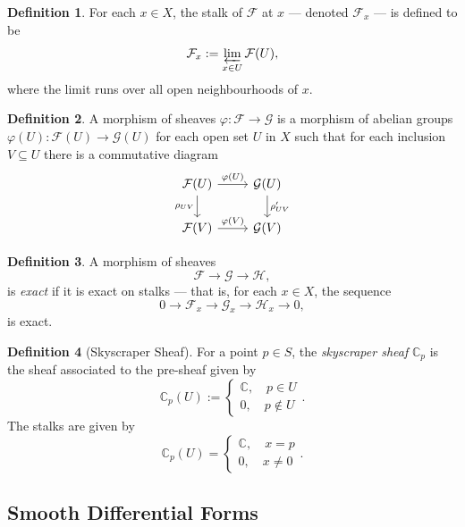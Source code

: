 \documentclass[a4paper]{report}
\theoremstyle{definition}
\newtheorem{definition}{Definition}
\theoremstyle{remark}
\theoremstyle{proposition}
\theoremstyle{conjecture}
\theoremstyle{lemma}
\theoremstyle{corollary}
\theoremstyle{exercise}
\theoremstyle{example}
\newcommand{\C}{\mathbb{C}}
\newcommand{\mcal}{\mathcal}
\begin{document}
\begin{definition}
    For each $x\in X$, the stalk of $\mcal{F}$ at $x$ --- denoted $\mcal{F}_x$ 
    --- is defined to be 
    $$\mcal{F}_x := \varprojlim_{x \in U}\mcal{F}(U),$$
    where the limit runs over all open neighbourhoods of $x$.
\end{definition}

\begin{definition}
    A morphism of sheaves $\varphi : \mcal{F} \to \mcal{G}$ 
    is a morphism of abelian groups $\varphi(U) : \mcal{F}(U) \to \mcal{G}(U)$
    for each open set $U$ in $X$ such that for each inclusion $V\subseteq U$
    there is a commutative diagram
    $$\begin{tikzcd}
\mcal{F}(U) \arrow[r, "\varphi(U)"] \arrow[d, "\rho_{UV}"'] & \mcal{G}(U) \arrow[d, "\rho_{UV}'"] \\
\mcal{F}(V) \arrow[r, "\varphi(V)"]                         & \mcal{G}(V)                        
\end{tikzcd}$$
\end{definition}

\begin{definition}
    A morphism of sheaves 
    $$\mcal{F} \longrightarrow \mcal{G} \longrightarrow \mcal{H},$$
    is \emph{exact} if it is exact on stalks --- that is, for each $x\in X$,
    the sequence
    $$0\longrightarrow \mcal{F}_x \longrightarrow \mcal{G}_x \longrightarrow \mcal{H}_x \longrightarrow 0,$$
    is exact.
\end{definition}

\begin{definition}[Skyscraper Sheaf]
    For a point $p\in S$, the \emph{skyscraper sheaf} $\C_p$ is the 
    sheaf associated to the pre-sheaf given by
    $$\C_p(U) := \begin{cases}
        \C, \quad p\in U\\
        0,\quad p\not\in U
    \end{cases}.$$
    The stalks are given by
    $$\C_p(U) = \begin{cases}
        \C,\quad x=p\\
        0,\quad x\neq 0
    \end{cases}.$$
\end{definition}

\subsection{Smooth Differential Forms}
\end{document}
